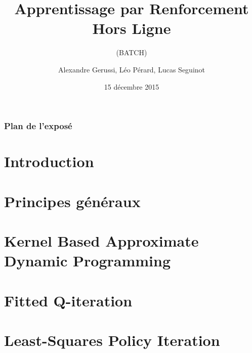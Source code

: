 \documentclass{beamer}
\title{Apprentissage par Renforcement Hors Ligne}
\subtitle{(BATCH)}
\date{15 décembre 2015}
\author{Alexandre Gerussi, Léo Pérard, Lucas Seguinot}
\institute{M2 MOCAD - IIR}
\begin{document}
\begin{frame}
\titlepage
\end{frame}

\begin{frame}
\frametitle{Plan de l'exposé}
\tableofcontents
\end{frame}

\section{Introduction}
\frame{
\frametitle{}
\begin{itemize}
\item 
\end{itemize}
}

\section{Principes généraux}
\frame{
\frametitle{}
\begin{itemize}
\item 
\end{itemize}
}
\frame{
\frametitle{}
\begin{itemize}
\item 
\end{itemize}
}

\section{Kernel Based Approximate Dynamic Programming}
\frame{
\frametitle{}
\begin{itemize}
\item 
\end{itemize}
}

\section{Fitted Q-iteration}
\frame{
\frametitle{}
\begin{itemize}
\item 
\end{itemize}
}

\section{Least-Squares Policy Iteration}
\frame{
\frametitle{}
\begin{itemize}
\item 
\end{itemize}
}

\frame{
\frametitle{}
\begin{itemize}
\item 
\end{itemize}
}
\end{document}
